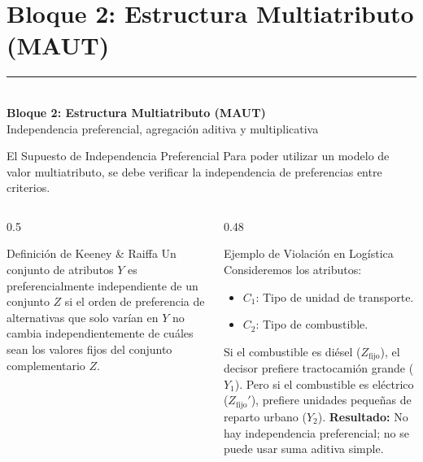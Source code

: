 \documentclass[aspectratio=169, 10pt]{beamer}
\begin{document}
\section{Bloque 2: Estructura Multiatributo (MAUT)}
\begingroup
{}
\begin{frame}[plain]
    \vfill
    \hspace{0.08\paperwidth}%
    {\color{UANLgold}\rule{4cm}{2pt}}\\[8pt]%
    \hspace{0.08\paperwidth}%
    {\color{FIMEwhite}\LARGE\rmfamily\bfseries Bloque 2: Estructura Multiatributo (MAUT)}\\[6pt]
    \hspace{0.08\paperwidth}%
    {\color{FIMEwhite!85}\large\sffamily Independencia preferencial, agregación aditiva y multiplicativa}
    \vfill
\end{frame}
\endgroup

\begin{frame}{El Supuesto de Independencia Preferencial}
    Para poder utilizar un modelo de valor multiatributo, se debe verificar la independencia de preferencias entre criterios.
    \begin{columns}
        \begin{column}{0.5\textwidth}
            \begin{block}{Definición de Keeney \& Raiffa}
                Un conjunto de atributos $Y$ es preferencialmente independiente de un conjunto $Z$ si el orden de preferencia de alternativas que solo varían en $Y$ no cambia independientemente de cuáles sean los valores fijos del conjunto complementario $Z$.
            \end{block}
        \end{column}
        
        \begin{column}{0.48\textwidth}
            \begin{alertblock}{Ejemplo de Violación en Logística}
                Consideremos los atributos:
                \begin{itemize}
                    \item $C_1$: Tipo de unidad de transporte.
                    \item $C_2$: Tipo de combustible.
                \end{itemize}
                Si el combustible es diésel ($Z_{\text{fijo}}$), el decisor prefiere tractocamión grande ($Y_1$). Pero si el combustible es eléctrico ($Z_{\text{fijo}}'$), prefiere unidades pequeñas de reparto urbano ($Y_2$).  
                \vskip 3pt
                \textbf{Resultado:} No hay independencia preferencial; no se puede usar suma aditiva simple.
            \end{alertblock}
        \end{column}
    \end{columns}
\end{frame}
\end{document}
